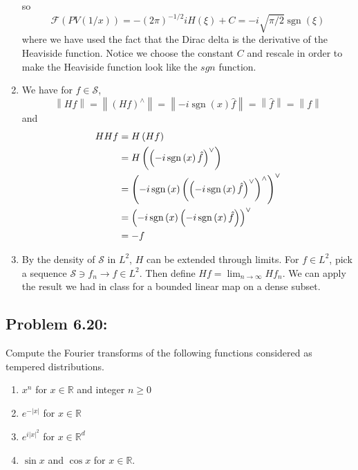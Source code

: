 \documentclass[letterpaper,twoside,11pt]{article}
\theoremstyle{mystyle}
\newcommand{\R}{{\mathbb R}}
\newcommand{\cbk}{\color{black}}
\newcommand{\sch}{\mathcal S}
\begin{document}
\begin{enumerate}
  so 
  \[\mathcal{F}\left( {PV\left( {1/x} \right)} \right) =  - {\left( {2\pi } \right)^{ - 1/2}}iH\left( \xi  \right) + C =  - i\sqrt {\pi /2} \operatorname{sgn} \left( \xi  \right)\]
  where we have used the fact that the Dirac delta is the derivative of the Heaviside function. Notice we choose the constant $C$ and rescale in order to make the Heaviside function look like the $sgn$ function. 
  \item We have for $f \in \sch$, 
  \[\left\| {Hf} \right\| = \left\| {{{\left( {Hf} \right)}^ \wedge }} \right\| = \left\| { - i\operatorname{sgn} \left( x \right)\hat f} \right\| = \left\| {\hat f} \right\| = \left\| f \right\|\]
  and
  \begin{align*}
    HHf &= H\left( {Hf} \right) \hfill \\
     &= H\left( {{{\left( { - i\operatorname{sgn} \left( x \right)\hat f} \right)}^ \vee }} \right) \hfill \\
     &= {\left( { - i\operatorname{sgn} \left( x \right){{\left( {{{\left( { - i\operatorname{sgn} \left( x \right)\hat f} \right)}^ \vee }} \right)}^ \wedge }} \right)^ \vee } \hfill \\
     &= {\left( { - i\operatorname{sgn} \left( x \right)\left( { - i\operatorname{sgn} \left( x \right)\hat f} \right)} \right)^ \vee } \hfill \\
     &=  - f  
  \end{align*}
  \item By the density of $\mathcal S$ in $L^2$, $H$ can be extended through limits. For $f\in L^2$, pick a sequence $\sch \ni f_n \to f \in L^2$. Then define $Hf = \lim_{n \to \infty} Hf_n$. We can apply the result we had in class for a bounded linear map on a dense subset. 
\end{enumerate}










\cbk 


\subsection*{Problem 6.20:}
Compute the Fourier transforms of the following functions considered as tempered distributions. 
\begin{enumerate}
  \item $x^n$ for $x \in \R$ and integer $n\geq 0$
  \item $e^{-|x|}$ for $x\in \R$
  \item $e^{i|x|^2}$ for $x \in \R^d$
  \item $\sin x$ and $\cos x$ for $x\in \R$. 
\end{enumerate}
\end{document}
